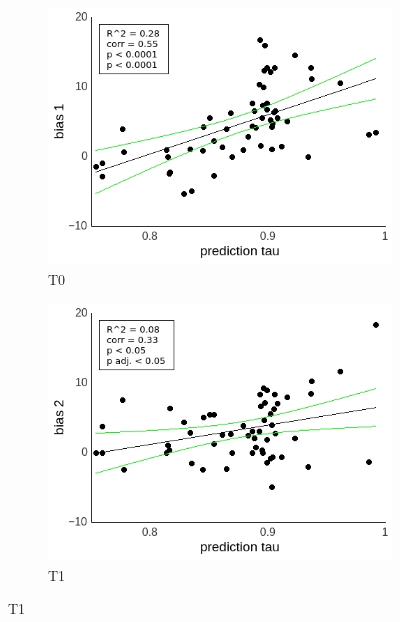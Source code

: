 \documentclass[a4paper]{scrreprt}
\begin{document}
\begin{figure}
\centering
\begin{subfigure}[b]{0.49\textwidth}
        \includegraphics[width=\textwidth]{figs/sec3/pred/predno_diff_1_mod1mod1.jpeg}
        \caption{T0}
    \end{subfigure}
    \begin{subfigure}[b]{0.49\textwidth}
        \includegraphics[width=\textwidth]{figs/sec3/pred/predno_diff_2_mod1mod1.jpeg}
        \caption{T1}
    \end{subfigure}


\end{figure}
\end{document}
